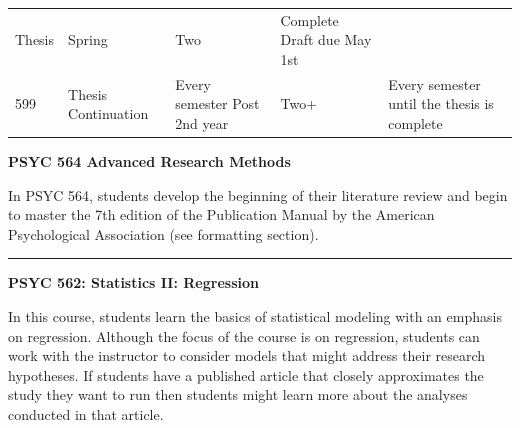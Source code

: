 \documentclass[openany]{book}
\begin{document}
\begin{longtable}[]{@{}lllll@{}}
\begin{minipage}[t]{0.27\columnwidth}
Thesis\strut
\end{minipage} & \begin{minipage}[t]{0.26\columnwidth}\raggedright
Spring\strut
\end{minipage} & \begin{minipage}[t]{0.10\columnwidth}\raggedright
Two\strut
\end{minipage} & \begin{minipage}[t]{0.19\columnwidth}\raggedright
Complete Draft due May 1st\strut
\end{minipage}\tabularnewline
\begin{minipage}[t]{0.03\columnwidth}\raggedright
599\strut
\end{minipage} & \begin{minipage}[t]{0.27\columnwidth}\raggedright
Thesis Continuation\strut
\end{minipage} & \begin{minipage}[t]{0.26\columnwidth}\raggedright
Every semester Post 2nd year\strut
\end{minipage} & \begin{minipage}[t]{0.10\columnwidth}\raggedright
Two+\strut
\end{minipage} & \begin{minipage}[t]{0.19\columnwidth}\raggedright
Every semester until the thesis is complete\strut
\end{minipage}\tabularnewline
\bottomrule
\end{longtable}

\textbf{PSYC 564 Advanced Research Methods}

In PSYC 564, students develop the beginning of their literature review and begin to master the 7th edition of the Publication Manual by the American Psychological Association (see formatting section).

\begin{center}\rule{0.5\linewidth}{0.5pt}\end{center}

\textbf{PSYC 562: Statistics II: Regression}

In this course, students learn the basics of statistical modeling with an emphasis on regression. Although the focus of the course is on regression, students can work with the instructor to consider models that might address their research hypotheses. If students have a published article that closely approximates the study they want to run then students might learn more about the analyses conducted in that article.
\end{document}

